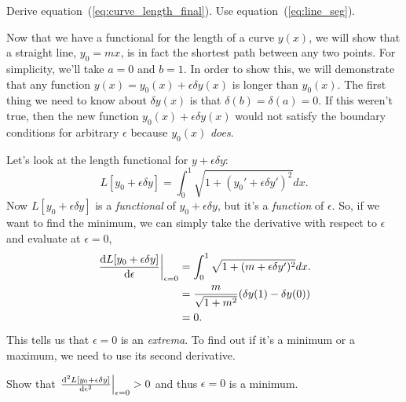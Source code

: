 \begin{Exercise}
  Derive equation~(\ref{eq:curve_length_final}). Use equation~(\ref{eq:line_seg}).
\end{Exercise}

Now that we have a functional for the length of a curve $y(x)$, we will show that a straight line, $y_0 = mx$, is in fact the shortest path between any two points. For simplicity, we'll take $a = 0$ and $b = 1$. In order to show this, we will demonstrate that any function $y(x) = y_0(x) + \epsilon \delta y(x)$ is longer than $y_0(x)$. The first thing we need to know about $\delta y(x)$ is that $\delta(b) = \delta(a) = 0$. If this weren't true, then the new function $y_0(x) + \epsilon \delta y(x)$ would not satisfy the boundary conditions for arbitrary $\epsilon$ because $y_0(x)$ \emph{does}.

Let's look at the length functional for $y + \epsilon \delta y$:
\begin{equation}
  \label{eq:line_perturb_length}
  L[y_0 + \epsilon \delta y] = \int_0^1 \sqrt{1 + (y_0' + \epsilon \delta y')^2 } dx.
\end{equation}
Now $L[y_0 + \epsilon \delta y]$ is a \emph{functional} of $y_0 + \epsilon \delta y$, but it's a \emph{function} of $\epsilon$. So, if we want to find the minimum, we can simply take the derivative with respect to $\epsilon$ and evaluate at $\epsilon = 0$,
\begin{equation}
  \begin{split}
    \label{eq:deriv_length}
    \eval{\dv{L[y_0 + \epsilon \delta y]}{\epsilon}}_{\epsilon=0} & = \int_0^1 \sqrt{1 + (m + \epsilon \delta y')^2 } dx.\\
    & = \frac{m}{\sqrt{1 + m^2}} \qty(\delta y(1) - \delta y(0))\\
    & = 0.\\
  \end{split}
\end{equation}
This tells us that $\epsilon = 0$ is an \emph{extrema}. To find out if it's a minimum or a maximum, we need to use its second derivative.
\begin{Exercise}
  Show that $\eval{\dv[2]{L[y_0 + \epsilon \delta y]}{\epsilon}}_{\epsilon = 0} > 0$ and thus $\epsilon = 0$ is a minimum.
\end{Exercise}


